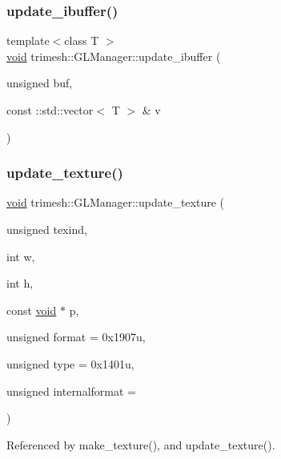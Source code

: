 \subsubsection{\texorpdfstring{update\+\_\+ibuffer()}{update\_ibuffer()}\hspace{0.1cm}{\footnotesize\ttfamily [3/3]}}
{\footnotesize\ttfamily template$<$class T $>$ \\
\hyperlink{namespacetrimesh_a784ddfd979e1c579bda795a8edfc3f43}{void} trimesh\+::\+G\+L\+Manager\+::update\+\_\+ibuffer (\begin{DoxyParamCaption}\item[{unsigned}]{buf,  }\item[{const \+::std\+::vector$<$ T $>$ \&}]{v }\end{DoxyParamCaption})\hspace{0.3cm}{\ttfamily [inline]}}

\mbox{\label{classtrimesh_1_1GLManager_ae214c8b0b500ad866bedb2655205cb50}} 
\subsubsection{\texorpdfstring{update\+\_\+texture()}{update\_texture()}\hspace{0.1cm}{\footnotesize\ttfamily [1/2]}}
{\footnotesize\ttfamily \hyperlink{namespacetrimesh_a784ddfd979e1c579bda795a8edfc3f43}{void} trimesh\+::\+G\+L\+Manager\+::update\+\_\+texture (\begin{DoxyParamCaption}\item[{unsigned}]{texind,  }\item[{int}]{w,  }\item[{int}]{h,  }\item[{const \hyperlink{namespacetrimesh_a784ddfd979e1c579bda795a8edfc3f43}{void} $\ast$}]{p,  }\item[{unsigned}]{format = {\ttfamily 0x1907u},  }\item[{unsigned}]{type = {\ttfamily 0x1401u},  }\item[{unsigned}]{internalformat = {} }\end{DoxyParamCaption})}



Referenced by make\+\_\+texture(), and update\+\_\+texture().

